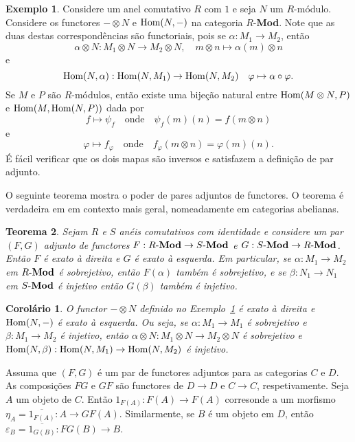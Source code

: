 \documentclass[12pt]{amsart}
\newtheorem{theorem}{Teorema}
\newtheorem{corollary}{Corolário}[theorem]
\theoremstyle{definition}
\newtheorem{example}[theorem]{Exemplo}
\begin{document}
\begin{example}\label{ex:tensorhom}
    Considere um anel comutativo $R$ com $1$ e seja $N$ um $R$-módulo. Considere os functores 
    $-\otimes N$ e ${\rm Hom}(N,-)$ na categoria $R$-{\bf Mod}. Note que as duas destas correspondências 
    são functoriais, pois se $\alpha:M_1\to M_2$, então
    \[
        \alpha\otimes N:M_1\otimes N\to M_2\otimes N, \quad m\otimes n\mapsto \alpha(m)\otimes n
    \]
    e
    \[
    {\rm Hom}(N,\alpha):{\rm Hom}(N,M_1)\to {\rm Hom}(N,M_2)\quad \varphi\mapsto \alpha\circ\varphi.
    \]
    Se $M$ e $P$ são $R$-módulos, então existe
    uma bijeção natural entre ${\rm Hom}(M\otimes N,P)$ e ${\rm Hom}(M,{\rm Hom}(N,P))$ dada por 
    \[
        f\mapsto \psi_f \quad\mbox{onde}\quad \psi_f(m)(n)=f(m\otimes n)
    \]
    e 
    \[
        \varphi\mapsto f_\varphi\quad\mbox{onde}\quad f_\varphi(m\otimes n)=\varphi(m)(n).
    \]
    É fácil verificar que os dois mapas são inversos e satisfazem a definição de par adjunto.
\end{example}

O seguinte teorema mostra o poder de pares adjuntos de functores. O teorema é verdadeira em em contexto 
mais geral, nomeadamente em categorias abelianas. 

\begin{theorem}
    Sejam $R$ e $S$ anéis comutativos com identidade e considere um par $(F,G)$ adjunto de functores 
    $F:R\textrm{-\bf Mod}\to S\textrm{-\bf Mod}$ e $G:S\textrm{-\bf Mod}\to R\textrm{-\bf Mod}$. Então 
    $F$ é exato à direita e $G$ é exato à esquerda.  Em particular, 
    se $\alpha:M_1\to M_2$ em $R\textrm{-\bf Mod}$ é sobrejetivo, então $F(\alpha)$ também é sobrejetivo, 
    e se $\beta:N_1\to N_1$ em $S\textrm{-\bf Mod}$ é injetivo então $G(\beta)$ também é injetivo.
\end{theorem}

\begin{corollary}
    O functor $-\otimes N$ definido no Exemplo~\ref{ex:tensorhom} é exato à direita e  ${\rm Hom}(N,-)$ é exato à esquerda. Ou seja, se 
    $\alpha:M_1\to M_1$ é sobrejetivo e $\beta:M_1\to M_2$ é injetivo, então 
    $\alpha\otimes N:M_1\otimes N\to M_2\otimes N$ é sobrejetivo e ${\rm Hom}(N,\beta):{\rm Hom}(N,M_1)\to 
    {\rm Hom}(N,M_2)$ é injetivo.
\end{corollary}

Assuma que $(F,G)$ é um par de functores adjuntos para as categorias $C$ e $D$. 
As composições $FG$ e $GF$ são functores de $D\to D$ e $C\to C$, respetivamente. Seja $A$ um objeto de $C$. 
Então $1_{F(A)}:F(A)\to F(A)$ corresonde a um morfismo $\eta_A=\overline{1_{F(A)}}:A\to GF(A)$. 
 Similarmente, se $B$ é um objeto em $D$, então 
$\varepsilon_B=\overline{1_{G(B)}}:FG(B)\to B$.  
\end{document}
